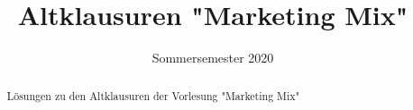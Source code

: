 \documentclass[]{article}
\title{Altklausuren "Marketing Mix"}
\date{Sommersemester 2020}
\begin{document}
\maketitle

\begin{abstract}
Lösungen zu den Altklausuren der Vorlesung "Marketing Mix"
\end{abstract}
\newpage


\end{document}
